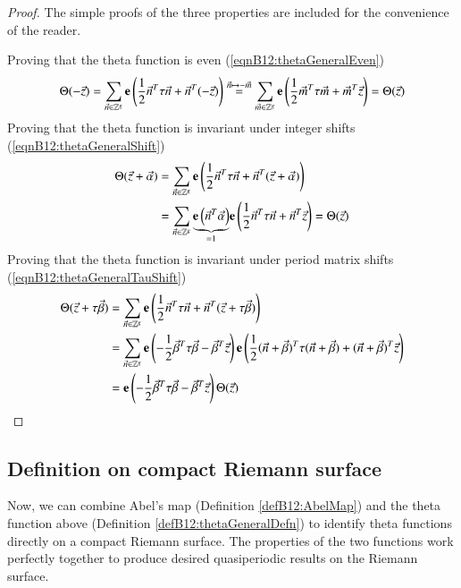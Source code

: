 \begin{proof} The simple proofs of the three properties are included for the convenience of the reader.

    Proving that the theta function is even (\ref{eqnB12:thetaGeneralEven})
    \begin{align}
        \Theta(-\vec z) = \sum_{\vec n \in \mathbb Z^g} \mathbf{e}\left(\frac{1}{2} \vec n^T \tau \vec n + \vec n^T (-\vec z)\right) \overset{\vec n \mapsto -\vec m}{=} \sum_{\vec m \in \mathbb Z^g} \mathbf{e}\left(\frac{1}{2} \vec m^T \tau \vec m + \vec m^T \vec z\right) = \Theta(\vec z)
    \end{align}
    Proving that the theta function is invariant under integer shifts (\ref{eqnB12:thetaGeneralShift})
    \begin{align}
        \Theta(\vec z + \vec \alpha) &= \sum_{\vec n \in \mathbb Z^g} \mathbf{e}\left(\frac{1}{2} \vec n^T \tau \vec n + \vec n^T (\vec z + \vec \alpha)\right) \\ &=
        \sum_{\vec n \in \mathbb Z^g} \underset{=1}{\underbrace{\mathbf{e}\left(\vec n^T \vec \alpha\right)}} \mathbf{e}\left(\frac{1}{2} \vec n^T \tau \vec n + \vec n^T \vec z\right) = \Theta(\vec z)
    \end{align}
    Proving that the theta function is invariant under period matrix shifts (\ref{eqnB12:thetaGeneralTauShift})
    \begin{align}
        \Theta(\vec z + \tau \vec \beta) &= \sum_{\vec n \in \mathbb Z^g} \mathbf{e}\left(\frac{1}{2} \vec n^T \tau \vec n + \vec n^T (\vec z + \tau \vec \beta)\right) \\ &=
        \sum_{\vec n \in \mathbb Z^g}
        \mathbf{e}\left(-\frac{1}{2} \vec \beta^T \tau \vec \beta - \vec \beta^T \vec z\right) \mathbf{e}\left(\frac{1}{2} (\vec n+\vec \beta)^T \tau (\vec n+\vec \beta) + (\vec n+\vec \beta)^T \vec z\right)\\
        &=  \mathbf{e}\left(-\frac{1}{2} \vec \beta^T \tau \vec \beta - \vec \beta^T \vec z\right) \Theta(\vec z) 
    \end{align}
\end{proof}

\subsection{Definition on compact Riemann surface}
Now, we can combine Abel's map (Definition \ref{defB12:AbelMap}) and the theta function above (Definition \ref{defB12:thetaGeneralDefn}) to identify theta functions directly on a compact Riemann surface. The properties of the two functions work perfectly together to produce desired quasiperiodic results on the Riemann surface.

